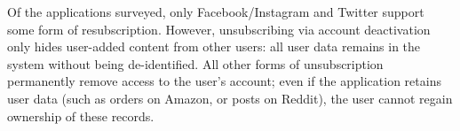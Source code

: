 Of the applications surveyed, only Facebook/Instagram and Twitter support some form of
resubscription. However, unsubscribing via account deactivation only hides user-added content from
other users: all user data remains in the system without being de-identified. 
All other forms of unsubscription permanently remove access to the user's account; even if the
application retains user data (such as orders on Amazon, or posts on Reddit), the user cannot regain
ownership of these records.

%
%
%
%
